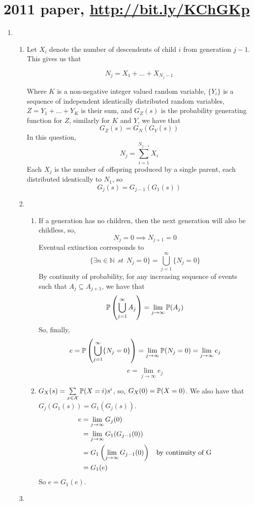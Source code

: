 \documentclass{article}
\begin{document}
\section*{2011 paper, \url{http://bit.ly/KChGKp}}
\begin{enumerate}
\item
\begin{enumerate}
\item
Let $X_i$ denote the number of descendents of child $i$ from generation $j-1$.
This gives us that

$$
N_j = X_1 + \dots + X_{N_j-1}
$$

Where $K$ is a non-negative integer valued random variable, $\{Y_i\}$ is a
sequence of independent identically distributed random variables,
$Z=Y_1+\dots+Y_K$ is their sum, and $G_Z(s)$ is the probability generating
function for $Z$, similarly for $K$ and $Y$, we have that
$$
G_Z(s) = G_N(G_Y(s))
$$
In this question, 
$$
N_j=\sum^{N_{j-1}}_{i=1}X_i
$$
Each $X_j$ is the number of offspring produced by a single parent, each
distributed identically to $N_1$, so
$$
G_j(s) = G_{j-1}(G_1(s))
$$
\item
\begin{enumerate}
\item 
If a generation has no children, then the next generation will also be
childless, so,
$$
N_j=0 \implies N_{j+1}=0
$$
Eventual extinction corresponds to 
$$
\{\exists n \in \mathbb{N} \;\, st \;\, N_j=0\} = \bigcup^\infty_{j=1}\{N_j=0\}
$$
By continuity of probability, for any increasing sequence of events such that
$A_j \subseteq A_{j+1}$, we have that
$$
\mathbb{P}\left(\bigcup^\infty_{j=1}A_j\right) = \lim_{j\rightarrow\infty} \mathbb{P}(A_j)
$$
So, finally,
$$
e=\mathbb{P}\left(\bigcup^\infty_{j=1}\{N_j=0\}\right) = \lim_{j\rightarrow\infty}
\mathbb{P}(N_j=0) = \lim_{j\rightarrow\infty}e_j
$$
$$
e=\lim_{j\rightarrow\infty}e_j
$$
\item
$G_X(s) = \sum\limits_{x \in \mathcal{X}}\mathbb{P}(X=i)s^i$, so, $G_X(0) = \mathbb{P}(X=0)$.
We also have that $G_j(G_1(s)) = G_1(G_j(s))$.
\begin{align*}
e &= \lim_{j\rightarrow\infty}G_j(0)\\
&= \lim_{j\rightarrow\infty}G_1(G_{j-1}(0))\\
&= G_1\left(\lim_{j\rightarrow\infty}G_{j-1}(0)\right)\mbox{\;\; by continuity
of G}\\
&= G_1(e)
\end{align*}
So $e = G_1(e)$.
\end{enumerate}
\item
\begin{enumerate}

\end{enumerate}
\end{enumerate}
\end{enumerate}
\end{document}
